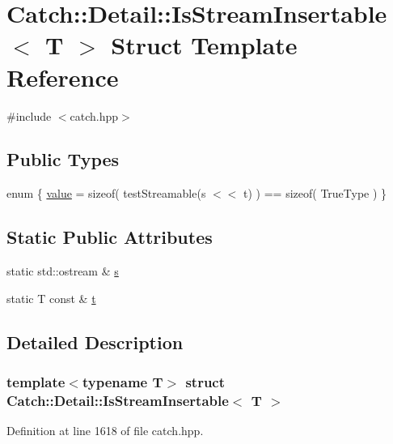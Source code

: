 \hypertarget{struct_catch_1_1_detail_1_1_is_stream_insertable}{}\section{Catch\+:\+:Detail\+:\+:Is\+Stream\+Insertable$<$ T $>$ Struct Template Reference}
\label{struct_catch_1_1_detail_1_1_is_stream_insertable}


{\ttfamily \#include $<$catch.\+hpp$>$}

\subsection*{Public Types}
\begin{DoxyCompactItemize}
\item 
enum \{ \hyperlink{struct_catch_1_1_detail_1_1_is_stream_insertable_a2e4508694da3bf368ff67733a7970edda765a324929702bfce2969fc19fc4f926}{value} = sizeof( test\+Streamable(s $<$$<$ t) ) == sizeof( True\+Type )
 \}
\end{DoxyCompactItemize}
\subsection*{Static Public Attributes}
\begin{DoxyCompactItemize}
\item 
static std\+::ostream \& \hyperlink{struct_catch_1_1_detail_1_1_is_stream_insertable_abe3d3c8e5d85665747faafffc9a96b00}{s}
\item 
static T const  \& \hyperlink{struct_catch_1_1_detail_1_1_is_stream_insertable_a7d2a3da978b6736667a7b2f6d51f507f}{t}
\end{DoxyCompactItemize}


\subsection{Detailed Description}
\subsubsection*{template$<$typename T$>$\newline
struct Catch\+::\+Detail\+::\+Is\+Stream\+Insertable$<$ T $>$}



Definition at line 1618 of file catch.\+hpp.



